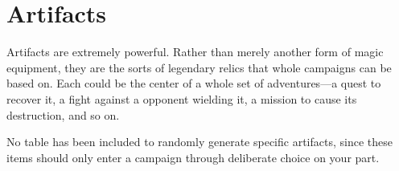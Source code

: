 \section{Artifacts}
Artifacts are extremely powerful. Rather than merely another form of magic equipment, they are the sorts of legendary relics that whole campaigns can be based on. Each could be the center of a whole set of adventures---a quest to recover it, a fight against a opponent wielding it, a mission to cause its destruction, and so on.

No table has been included to randomly generate specific artifacts, since these items should only enter a campaign through deliberate choice on your part.



